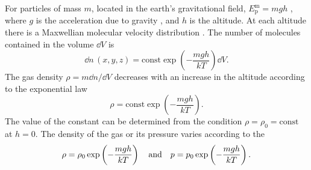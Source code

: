  For particles of mass $m$, located in the earth's gravi­tational field, $E_{\textrm{p}}^{\text{m}}= mgh$ , where $g$ is the acceleration due to gravity , and $h$ is the altitude. At each altitude there is a Maxwellian molecular velocity distribution . The number of molecules contained in the volume $\dd V$ is
\begin{equation*}%
\dd n \,(x, y, z) = \textrm{const} \exp\left( -\frac{mgh}{kT}\right) \dd V.
\end{equation*}
The gas density $\rho = m \dd n/ \dd V$ decreases with an increase in the altitude according to the exponential law 
\begin{equation*}%
\rho = \text{const} \exp\left( -\frac{mgh}{kT}\right).
\end{equation*}
The value of the constant can be determined from the condition $\rho = \rho_{0} = \text{const}$ at $h = 0$. The density of the gas or its pressure varies according to the 
\begin{equation*}%
\rho = \rho_{0} \exp\left( -\frac{mgh}{kT}\right) \qq{and} p = p_{0} \exp\left( -\frac{mgh}{kT}\right).
\end{equation*}

